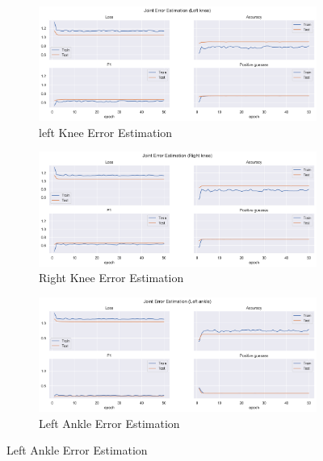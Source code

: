 \begin{figure}[!htbp]
  \centering
  \begin{subfigure}[b]{0.47\linewidth}
      \centering
      \includegraphics[width=\textwidth]{figures/Results/v1/jt/Left knee_ErrorEstimation.png}
      \caption{left Knee Error Estimation}
      \label{fig:v1_lekn_jt_ee}
  \end{subfigure}
  \hfill
  \begin{subfigure}[b]{0.47\linewidth}
      \centering
      \includegraphics[width=\textwidth]{figures/Results/v1/jt/Right knee_ErrorEstimation.png}
      \caption{Right Knee Error Estimation}
      \label{fig:v1_rikn_jt_ee}
  \end{subfigure}
  \hfill
  \begin{subfigure}[b]{0.47\linewidth}
      \centering
      \includegraphics[width=\textwidth]{figures/Results/v1/jt/Left ankle_ErrorEstimation.png}
      \caption{Left Ankle Error Estimation}

\end{subfigure}
\end{figure}
